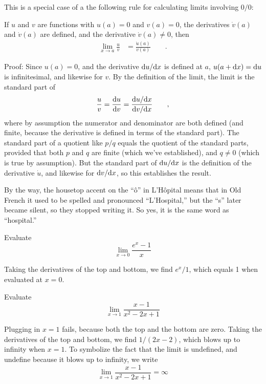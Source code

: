 This is a special case of a the following rule for calculating limits involving $0/0$:

\begin{important}
If $u$ and $v$ are functions with $u(a)=0$ and $v(a)=0$, the derivatives $\dot{v}(a)$ and $\dot{v}(a)$ are defined,
and the derivative $\dot{v}(a)\ne 0$,
then
\begin{align*}
  \lim_{x\rightarrow a} \frac{u}{v} &= \frac{\dot{u}(a)}{\dot{v}(a)} \qquad .
\end{align*}
\end{important}

Proof: Since $u(a)=0$, and the derivative $\textup{d} u/\textup{d} x$ is defined at $a$, $u(a+\textup{d} x)=\textup{d} u$ is infinitesimal, and likewise for $v$. By the definition
of the limit, the limit is the standard part of
\begin{equation*}
  \frac{u}{v} = \frac{\textup{d} u}{\textup{d} v} = \frac{\textup{d} u/\textup{d} x}{\textup{d} v/\textup{d} x} \qquad ,
\end{equation*}
where by assumption the numerator and denominator are both defined (and finite, because the derivative
is defined in terms of the standard part). The standard part of a quotient like $p/q$ equals the quotient of the
standard parts, provided that both $p$ and $q$ are finite (which we've established), and $q \ne 0$ (which is
true by assumption). But the standard part of $\textup{d} u/\textup{d} x$ is the definition of the derivative $\dot{u}$, and
likewise for  $\textup{d} v/\textup{d} x$, so this establishes the result.

By the way, the housetop accent on the ``\^{o}'' in L'H\^{o}pital means that in Old French it used to be spelled and
pronounced ``L'Hospital,'' but the ``s'' later became silent, so they stopped writing it. So yes, it is the
same word as ``hospital.''

\begin{eg}
\egquestion Evaluate
\begin{equation*}
  \lim_{x\rightarrow 0} \frac{e^x-1}{x}
\end{equation*}

\eganswer Taking the derivatives of the top and bottom, we find $e^x/1$, which equals 1 when
evaluated at $x=0$.
\end{eg}

\begin{eg}
\egquestion Evaluate
\begin{equation*}
  \lim_{x\rightarrow 1} \frac{x-1}{x^2-2x+1}
\end{equation*}

\eganswer Plugging in $x=1$ fails, because both the top and the bottom are zero.
Taking the derivatives of the top and bottom, we find $1/(2x-2)$, which blows up to
infinity when $x=1$. To symbolize the fact that
the limit is undefined, and undefine because it blows up to infinity, we write
\begin{equation*}
  \lim_{x\rightarrow 1} \frac{x-1}{x^2-2x+1} = \infty
\end{equation*}
\end{eg}

